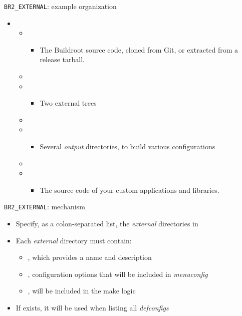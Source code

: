 \begin{frame}{{\tt BR2\_EXTERNAL}: example organization}

  \begin{itemize}
  \item {}
    \begin{itemize}
    \item {}
      \begin{itemize}
      \item The Buildroot source code, cloned from Git, or extracted
        from a release tarball.
      \end{itemize}
    \item {}
    \item {}
      \begin{itemize}
      \item Two external trees
      \end{itemize}
    \item {}
    \item {}
      \begin{itemize}
      \item Several {\em output} directories, to build various configurations
      \end{itemize}
    \item {}
    \item {}
      \begin{itemize}
      \item The source code of your custom applications and libraries.
      \end{itemize}
    \end{itemize}
  \end{itemize}
\end{frame}

\begin{frame}{{\tt BR2\_EXTERNAL}: mechanism}
  \begin{itemize}
  \item Specify, as a colon-separated list, the {\em external}
    directories in 
  \item Each {\em external} directory must contain:
    \begin{itemize}
    \item {}, which provides a name and description
    \item {}, configuration options that will be
      included in {\em menuconfig}
    \item {}, will be included in the make logic
    \end{itemize}
  \item If  exists, it will be used when listing all
    {\em defconfigs}
  \end{itemize}
\end{frame}

